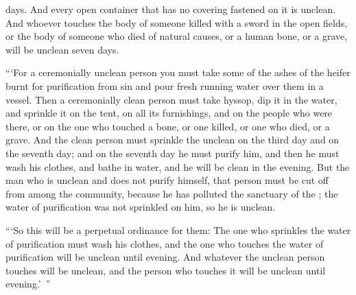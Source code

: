{days.
And every
open
container
that
has no
covering
fastened
on
it is
unclean.
And whoever
touches
the body of someone killed
with a sword
in the open
fields,
or
the body of someone who died
of natural causes, or
a human
bone,
or
a grave,
will be unclean
seven
days.
\par }{\PP {}“‘For a ceremonially unclean
person you must take
some of the ashes
of the heifer burnt
for purification
from sin and pour fresh running
water
over
them
in a vessel.
Then a ceremonially clean
person
must take
hyssop,
dip
it in the water,
and sprinkle
it on
the tent,
on
all
its furnishings,
and on
the people
who
were there,
or on
the one who touched
a bone,
or
one killed,
or
one who died,
or
a grave.
And the clean
person must sprinkle
the unclean
on
the third
day
and on
the seventh
day;
and on
the seventh
day
he must purify
him, and then he must wash
his clothes,
and bathe
in water,
and he will be clean
in the evening.
But the man
who
is unclean
and does not
purify
himself, that person must be cut off
from among
the community,
because
he has polluted
the sanctuary
of the {}; the water
of purification
was not
sprinkled
on
him, so he is
unclean.
\par }{\PP {}“‘So this will be
a perpetual
ordinance
for them: The one who sprinkles
the water
of purification
must wash
his clothes,
and the one who touches
the water
of purification
will be unclean
until
evening.
And whatever
the unclean
person touches
will be unclean,
and the person
who touches
it will be unclean
until
evening.’ ”


}
